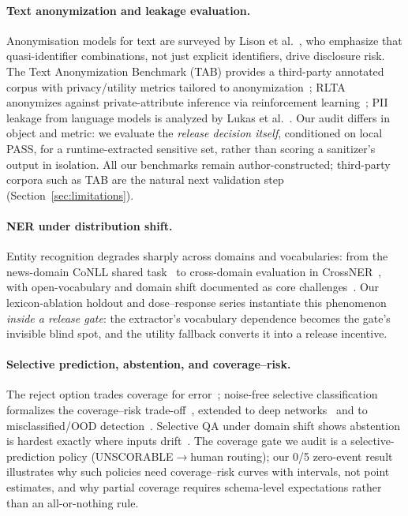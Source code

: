 \documentclass[11pt,a4paper]{article}
\begin{document}
\paragraph{Text anonymization and leakage evaluation.} Anonymisation models for text are surveyed by Lison et al.~\cite{lison2021anonymisation}, who emphasize that quasi-identifier combinations, not just explicit identifiers, drive disclosure risk. The Text Anonymization Benchmark (TAB) provides a third-party annotated corpus with privacy/utility metrics tailored to anonymization~\cite{pilan2022tab}; RLTA anonymizes against private-attribute inference via reinforcement learning~\cite{mosallanezhad2019rlta}; PII leakage from language models is analyzed by Lukas et al.~\cite{lukas2023pii}. Our audit differs in object and metric: we evaluate the \emph{release decision itself}, conditioned on local PASS, for a runtime-extracted sensitive set, rather than scoring a sanitizer's output in isolation. All our benchmarks remain author-constructed; third-party corpora such as TAB are the natural next validation step (Section~\ref{sec:limitations}).

\paragraph{NER under distribution shift.} Entity recognition degrades sharply across domains and vocabularies: from the news-domain CoNLL shared task~\cite{tjong2003conll} to cross-domain evaluation in CrossNER~\cite{liu2021crossner}, with open-vocabulary and domain shift documented as core challenges~\cite{fu2018survey}. Our lexicon-ablation holdout and dose--response series instantiate this phenomenon \emph{inside a release gate}: the extractor's vocabulary dependence becomes the gate's invisible blind spot, and the utility fallback converts it into a release incentive.

\paragraph{Selective prediction, abstention, and coverage--risk.} The reject option trades coverage for error~\cite{chow1970reject}; noise-free selective classification formalizes the coverage--risk trade-off~\cite{elyaniv2010selective}, extended to deep networks~\cite{geifman2017selective} and to misclassified/OOD detection~\cite{hendrycks2017baseline}. Selective QA under domain shift shows abstention is hardest exactly where inputs drift~\cite{kamath2020selective}. The coverage gate we audit is a selective-prediction policy (UNSCORABLE$\to$human routing); our 0/5 zero-event result illustrates why such policies need coverage--risk curves with intervals, not point estimates, and why partial coverage requires schema-level expectations rather than an all-or-nothing rule.
\end{document}
